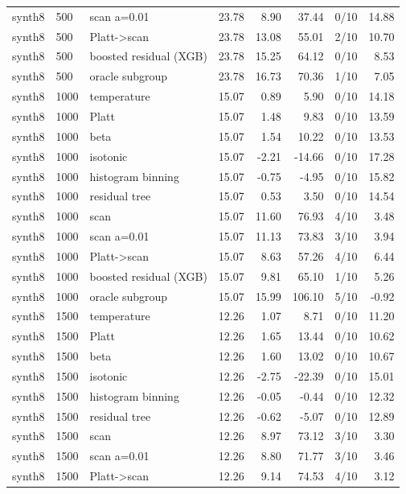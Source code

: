 \begin{tabular}{lllrrrlr}
synth8 & 500 & scan a=0.01 & 23.78 & 8.90 & 37.44 & 0/10 & 14.88 \\
synth8 & 500 & Platt->scan & 23.78 & 13.08 & 55.01 & 2/10 & 10.70 \\
synth8 & 500 & boosted residual (XGB) & 23.78 & 15.25 & 64.12 & 0/10 & 8.53 \\
synth8 & 500 & oracle subgroup & 23.78 & 16.73 & 70.36 & 1/10 & 7.05 \\
synth8 & 1000 & temperature & 15.07 & 0.89 & 5.90 & 0/10 & 14.18 \\
synth8 & 1000 & Platt & 15.07 & 1.48 & 9.83 & 0/10 & 13.59 \\
synth8 & 1000 & beta & 15.07 & 1.54 & 10.22 & 0/10 & 13.53 \\
synth8 & 1000 & isotonic & 15.07 & -2.21 & -14.66 & 0/10 & 17.28 \\
synth8 & 1000 & histogram binning & 15.07 & -0.75 & -4.95 & 0/10 & 15.82 \\
synth8 & 1000 & residual tree & 15.07 & 0.53 & 3.50 & 0/10 & 14.54 \\
synth8 & 1000 & scan & 15.07 & 11.60 & 76.93 & 4/10 & 3.48 \\
synth8 & 1000 & scan a=0.01 & 15.07 & 11.13 & 73.83 & 3/10 & 3.94 \\
synth8 & 1000 & Platt->scan & 15.07 & 8.63 & 57.26 & 4/10 & 6.44 \\
synth8 & 1000 & boosted residual (XGB) & 15.07 & 9.81 & 65.10 & 1/10 & 5.26 \\
synth8 & 1000 & oracle subgroup & 15.07 & 15.99 & 106.10 & 5/10 & -0.92 \\
synth8 & 1500 & temperature & 12.26 & 1.07 & 8.71 & 0/10 & 11.20 \\
synth8 & 1500 & Platt & 12.26 & 1.65 & 13.44 & 0/10 & 10.62 \\
synth8 & 1500 & beta & 12.26 & 1.60 & 13.02 & 0/10 & 10.67 \\
synth8 & 1500 & isotonic & 12.26 & -2.75 & -22.39 & 0/10 & 15.01 \\
synth8 & 1500 & histogram binning & 12.26 & -0.05 & -0.44 & 0/10 & 12.32 \\
synth8 & 1500 & residual tree & 12.26 & -0.62 & -5.07 & 0/10 & 12.89 \\
synth8 & 1500 & scan & 12.26 & 8.97 & 73.12 & 3/10 & 3.30 \\
synth8 & 1500 & scan a=0.01 & 12.26 & 8.80 & 71.77 & 3/10 & 3.46 \\
synth8 & 1500 & Platt->scan & 12.26 & 9.14 & 74.53 & 4/10 & 3.12 \\

\end{tabular}
